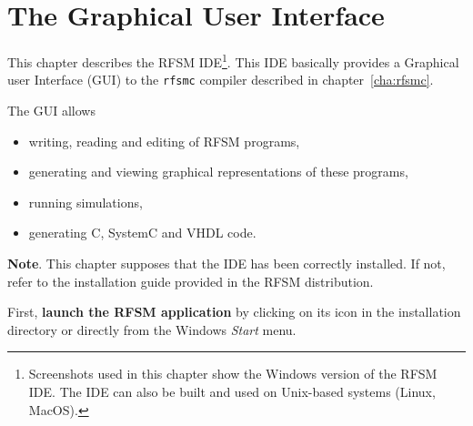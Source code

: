 \chapter{The Graphical User Interface}
\label{cha:gui}

This chapter describes the RFSM IDE\footnote{Screenshots used in this chapter show the Windows
  version of the RFSM IDE. The IDE can also be built and used on Unix-based systems (Linux,
  MacOS).}. This IDE basically provides a Graphical user Interface (GUI) to the \verb|rfsmc|
compiler described in chapter~\ref{cha:rfsmc}.

\medskip
The GUI allows
\begin{itemize}
\item writing, reading and editing of RFSM programs,
\item generating and viewing graphical representations of these programs,
\item running simulations,
\item generating C, SystemC and VHDL code.
\end{itemize}

\medskip
\textbf{Note}. This chapter supposes that the IDE has been correctly installed. If not, refer to the
installation guide provided in the RFSM distribution.

\medskip
First, \textbf{launch the RFSM application} by clicking on its icon in the installation directory or
directly from the Windows \emph{Start} menu. 

